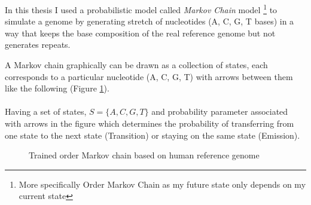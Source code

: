 \documentclass[11pt,a4paper]{report}
\begin{document}
In this thesis I used a probabilistic model called \emph{Markov Chain} model 
\footnote{More specifically  Order Markov Chain as my future state only 
depends on my current state} to simulate a genome by generating stretch of 
nucleotides (A, C, G, T bases) in a way that  keeps the base composition of the 
real reference genome but not generates repeats.
 
 
A Markov chain graphically can be drawn as a collection of states, 
each corresponds to a particular nucleotide (A, C, G, T) with arrows
between them like the following (Figure \ref{MC}). 
\\\\ 
Having a set of states,  $ S= \{ A, C,  G, T \}$  and probability
parameter  associated with arrows in the figure which determines the
probability of transferring from one state to the next state (Transition)
or staying on the same state (Emission).

\begin{figure}
 \begin{center}
  \caption{Trained  order Markov chain based on human reference genome}
  \label{MC}
 \end{center}
\end{figure}
\end{document}
